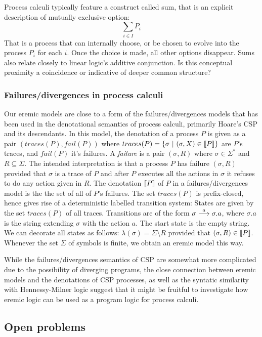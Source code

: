 Process calculi typically feature a construct called sum, that is an
explicit description of mutually exclusive option:
\[
     \sum_{i \in I} P_i
\]
That is a process that can internally choose, or be chosen to evolve
into the process $P_i$ for each $i$. Once the choice is made, all
other options disappear.  Sums also relate closely to linear logic's
additive conjunction. Is this conceptual proximity a coincidence or
indicative of deeper common structure?


\subsubsection{Failures/divergences in process calculi}

Our eremic models are close to a form of the failures/divergences
models that has been used in the denotational semantics of process
calculi, primarily Hoare's CSP \cite{HoareC:comseq,RoscoeAW:theapoc}
and its descendants.  In this model, the denotation of a process $P$
is given as a pair $(traces(P), fail(P))$ where $traces(P) = \{
\sigma\ |\ (\sigma, X) \in \lbrack\!\lbrack P \rbrack\!\rbrack \}$ are $P$'s traces, and
$fail(P)$ it's failures.  A \emph{failure} is a pair $(\sigma, R)$
where $\sigma \in \Sigma^*$ and $R \subseteq \Sigma$. The intended
interpretation is that a process $P$ has failure $(\sigma, R)$
provided that $\sigma$ is a trace of $P$ and after $P$ executes all
the actions in $\sigma$ it refuses to do any action given in $R$. The
denotation $\lbrack\!\lbrack P \rbrack\!\rbrack$ of $P$ in a failures/divergences model is the
the set of all of $P$'s failures. The set $ traces(P)$ is
prefix-closed, hence gives rise of a deterministic labelled transition
system: States are given by the set $traces(P)$ of all traces.
Transitions are of the form $\sigma \stackrel{a}{\longrightarrow} \sigma.a$, where
$\sigma.a$ is the string extending $\sigma$ with the action $a$.  The
start state is the empty string.  We can decorate all states as
follows: $ \lambda (\sigma) = \Sigma \setminus R $ provided that
$(\sigma, R) \in \lbrack\!\lbrack P \rbrack\!\rbrack$.  Whenever the set $\Sigma$ of symbols is
finite, we obtain an eremic model this way.

While the failures/divergences semantics of CSP are somewhat more
complicated due to the possibility of diverging programs, the close
connection between eremic models and the denotations of CSP processes,
as well as the syntatic similarity with Hennessy-Milner logic suggest
that it might be fruitful to investigate how eremic logic can be used
as a program logic for process calculi.

\subsection{Open problems} 

